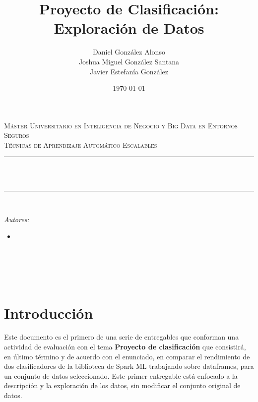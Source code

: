 \documentclass[12pt]{article}
\title{Proyecto de Clasificación: Exploración de Datos}			%
\author{Daniel González Alonso\\		%
        Joshua Miguel González Santana\\
		Javier Estefanía González}
\date{\today}							%
\makeatletter
\let\thetitle\@title
\let\theauthor\@author
\let\thedate\@date
\makeatother
\begin{document}
\begin{titlepage}
	\centering
    \vspace*{0.25 cm}
	
	\doublespacing
	\textsc{\LARGE Máster Universitario en Inteligencia de Negocio y Big Data en Entornos Seguros}\\[0.5 cm]
	\singlespacing
	\textsc{\large Técnicas de Aprendizaje Automático Escalables}\\[0.5 cm]
	
	\rule{\linewidth}{0.2 mm}\\[0.4 cm]
	\textsc{\huge \bf \thetitle}\\
	\rule{\linewidth}{0.2 mm}\\[2.5 cm]
	
	\begin{minipage}{0.6\textwidth}
		\begin{flushleft} \large
			\emph{Autores:}\\
			\begin{itemize}
            	\item[] \theauthor
            \end{itemize}
		\end{flushleft}
	\end{minipage}~
	\begin{minipage}{0.3\textwidth}
		\begin{flushright} \large
		\end{flushright}
	\end{minipage}\\[6 cm]
	{\large \thedate}\\[2 cm]

	\vfill	
\end{titlepage}

\tableofcontents
\pagebreak

\section{Introducción}
Este documento es el primero de una serie de entregables que conforman una actividad de evaluación con el tema \textbf{Proyecto de clasificación} que consistirá, en último término y de acuerdo con el enunciado, en comparar el rendimiento de dos clasificadores de la biblioteca de Spark ML trabajando sobre dataframes, para un conjunto de datos seleccionado. Este primer entregable  está enfocado a la descripción y la exploración de los datos, sin modificar el conjunto original de datos.\\
\end{document}
